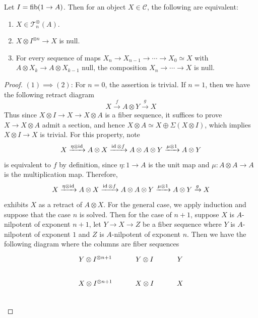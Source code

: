 	\begin{lemma}\label{Nilp_equiv_defn}
		Let $I=\operatorname{\mathrm{fib}}(1\to A)$. Then for an object $X\in\mathcal{C}$, the following are equivalent: 
		\begin{enumerate}
			\item $X\in\mathcal{T}_n^\otimes(A)$. 
			\item $X\otimes I^{\otimes n}\to X$ is null. 
			\item For every sequence of maps $X_n\to X_{n-1}\to\cdots\to X_0\simeq X$ with $A\otimes X_k\to A\otimes X_{k-1}$ null, the composition $X_n\to\cdots\to X$ is null. 
		\end{enumerate}
	\end{lemma}
	\begin{proof}
		$(1)\implies(2)$: For $n=0$, the assertion is trivial. If $n=1$, then we have the following retract diagram 
		\[ X\xrightarrow{f}A\otimes Y\xrightarrow{g}X \]
		Thus since $X\otimes I\to X\to X\otimes A$ is a fiber sequence, it suffices to prove $X\to X\otimes A$ admit a section, and hence $X\otimes A\simeq X\oplus\Sigma(X\otimes I)$, which implies $X\otimes I\to X$ is trivial. For this property, note 
		\[ X\xrightarrow{\eta\otimes\operatorname{\mathrm{id}}}A\otimes X\xrightarrow{\operatorname{\mathrm{id}}\otimes f}A\otimes A\otimes Y\xrightarrow{\mu\otimes 1} A\otimes Y \]
		is equivalent to $f$ by definition, since $\eta:1\to A$ is the unit map and $\mu:A\otimes A\to A$ is the multiplication map. Therefore, 
		\[ X\xrightarrow{\eta\otimes\operatorname{\mathrm{id}}}A\otimes X\xrightarrow{\operatorname{\mathrm{id}}\otimes f}A\otimes A\otimes Y\xrightarrow{\mu\otimes 1} A\otimes Y\xrightarrow{g}X \]
		exhibits $X$ as a retract of $A\otimes X$. For the general case, we apply induction and suppose that the case $n$ is solved. Then for the case of $n+1$, suppose $X$ is $A$-nilpotent of exponent $n+1$, let $Y\to X\to Z$ be a fiber sequence where $Y$ is $A$-nilpotent of exponent $1$ and $Z$ is $A$-nilpotent of exponent $n$. Then we have the following diagram where the columns are fiber sequences 
		\[\begin{tikzcd}[ampersand replacement=\&]
			{Y\otimes I^{\otimes n+1}} \& {Y\otimes I} \& Y \\
			{X\otimes I^{\otimes n+1}} \& {X\otimes I} \& X \\

\end{tikzcd}\]
\end{proof}

